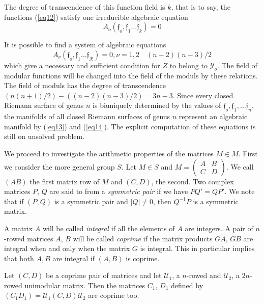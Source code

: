 The degree of transcendence of this function field is $k$,
that is to say, the functions (\ref{eq12}) satisfy one irreducible algebraic
equation 
\begin{equation*}
A_o (\mathfrak{f}_o, \mathfrak{f}_1 \ldots \mathfrak{f}_k) = 0
\tag{13}\label{eq13}  
\end{equation*}

It is possible to find a system of algebraic equations
\begin{equation*}
A_\nu (\mathfrak{f}_o, \mathfrak{f}_1 \ldots \mathfrak{f}_\mathscr{R}) =
0,   \nu = 1,2 \quad (n-2)(n-3)/2 \tag{14}\label{eq14} 
\end{equation*}
which give a necessary and sufficient condition for $Z$ to belong to
$\mathscr{Y}_o$. The field of modular functions will be changed into
the field of the moduls by these relations. The field of moduls has
the degree of transcendence\pageoriginale  $(n(n+1)/2) -
((n-2)(n-3)/2) = 3 n 
-3$. Since every closed Riemann surface of genus $n$ is biuniquely
determined by the values of $\mathfrak{f}_o,\mathfrak{f}_1,\ldots
\mathfrak{f}_n$, the manifolds of all closed Riemann surfaces of genus
$n$ represent an algebraic manifold by (\ref{eq13}) and
(\ref{eq14}). The explicit 
computation of these equations is still on unsolved problem. 

We proceed to investigate the arithmetic properties of the matrices $M
\in M$. First we consider the more general group $S$. Let $M \in S$
and $M = \begin{pmatrix} A & B \\ C & D \end{pmatrix}$. We call $(A
B)$ the first matrix row of $M$ and $(C, D)$, the second. Two complex
matrices $P$, $Q$ are said to from a \textit{symmetric pair} if we
have $PQ' = QP'$. We note that  if $(P, Q)$ is a symmetric pair and $|
Q | \neq 0$, then $Q^{-1}P$ is a symmetric matrix. 

A matrix $A$ will be called \textit{integral} if all the elements of
$A$ are integers. A pair of $n$-rowed matrices $A$, $B$  will be called
\textit{coprime} if the matrix products $GA$, $GB$ are integral when
and only when the matrix $G$ is integral. This in particular implies
that both $A, B$ are integral if $(A, B)$ is coprime. 

Let $(C, D)$ be a coprime pair of matrices and let $\mathscr{U}_1$, a
$n$-rowed and $\mathscr{U}_2$, a $2n$-rowed unimodular matrix. Then the
matrices $C_1$, $D_1$ defined by $(C_1   D_1) = \mathscr{U}_1(C,
D)\mathscr{U}_2$ are coprime too.  

